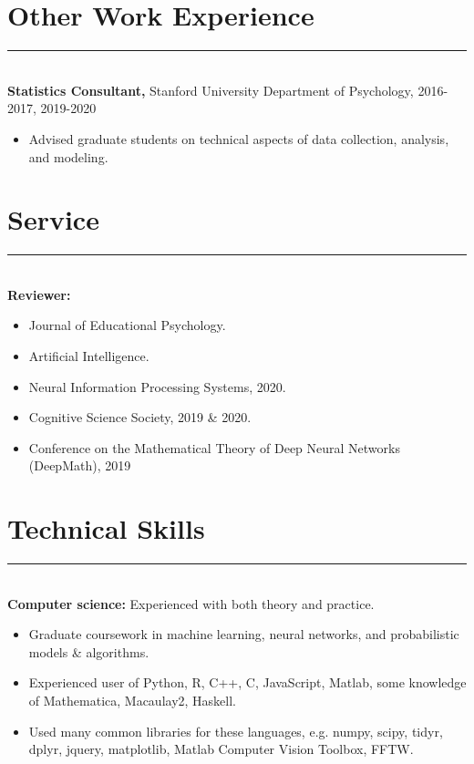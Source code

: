 \documentclass[margin]{res}
\begin{document}
\begin{resume}
\vspace{1pt}\section{Other Work Experience} \vspace{-15pt} \rule{\textwidth}{0.5pt} \\[3pt]
{\bf Statistics Consultant,} Stanford University Department of Psychology, 2016-2017, 2019-2020
\begin{itemize} \itemsep -2pt
 \item Advised graduate students on technical aspects of data collection, analysis, and modeling. \end{itemize}
\vspace{1pt}\section{Service} \vspace{-15pt} \rule{\textwidth}{0.5pt} \\[3pt]
{\bf Reviewer:} 
\begin{itemize} \itemsep -2pt
 \item Journal of Educational Psychology.
 \item Artificial Intelligence.
 \item Neural Information Processing Systems, 2020.
 \item Cognitive Science Society, 2019 \& 2020.
 \item Conference on the Mathematical Theory of Deep Neural Networks (DeepMath), 2019\end{itemize}
\vspace{1pt}\section{Technical Skills} \vspace{-15pt} \rule{\textwidth}{0.5pt} \\[3pt]
{\bf Computer science:} Experienced with both theory and practice. 
\begin{itemize} \itemsep -2pt
  \item Graduate coursework in machine learning, neural networks, and probabilistic models \& algorithms.
  \item Experienced user of Python, R, C++, C, JavaScript, Matlab, some knowledge of Mathematica, Macaulay2, Haskell. 
  \item Used many common libraries for these languages, e.g. numpy, scipy, tidyr, dplyr, jquery, matplotlib, Matlab Computer Vision Toolbox, FFTW.

\end{itemize}
\end{resume}
\end{document}
